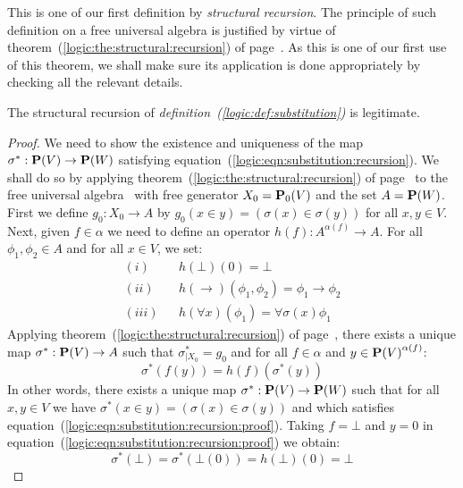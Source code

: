 This is one of our first definition by {\em structural recursion}.
The principle of such definition on a free universal algebra is
justified by virtue of
theorem~(\ref{logic:the:structural:recursion}) of
page~\pageref{logic:the:structural:recursion}. As this is one of our
first use of this theorem, we shall make sure its application is
done appropriately by checking all the relevant details.
\begin{prop}\label{logic:prop:substitution}
The structural recursion of {\em definition~(\ref{logic:def:substitution})} is legitimate.
\end{prop}
\begin{proof}
We need to show the existence and uniqueness of the map
$\sigma^{*}:\mbox{${\bf P}(V)$}\to{\bf P}(W)$ satisfying
equation~(\ref{logic:eqn:substitution:recursion}). We shall do so by
applying theorem~(\ref{logic:the:structural:recursion}) of
page~\pageref{logic:the:structural:recursion} to the free universal
algebra \pv\ with free generator $X_{0}=\mbox{${\bf P}_{0}(V)$}$ and the set $A={\bf
P}(W)$. First we define $g_{0}:X_{0}\to A$ by $g_{0}(x\in
y)=(\sigma(x)\in\sigma(y))$ for all $x,y\in V$. Next, given
$f\in\alpha$ we need to define an operator $h(f):A^{\alpha(f)}\to
A$. For all $\phi_{1},\phi_{2}\in A$ and for all $x\in V$, we set:
    \begin{eqnarray*}
    (i)&&h(\bot)(0)=\bot\\
    (ii)&&h(\to)(\phi_{1},\phi_{2})=\phi_{1}\to\phi_{2}\\
    (iii)&&h(\forall x)(\phi_{1})=\forall \sigma(x)\phi_{1}
    \end{eqnarray*}
Applying theorem~(\ref{logic:the:structural:recursion}) of
page~\pageref{logic:the:structural:recursion}, there exists a unique
map $\sigma^{*}:\mbox{${\bf P}(V)$}\to A$ such that $\sigma^{*}_{|X_{0}}=g_{0}$ and
for all $f\in\alpha$ and $y\in\mbox{${\bf P}(V)$}^{\alpha(f)}$:
    \begin{equation}\label{logic:eqn:substitution:recursion:proof}
    \sigma^{*}(f(y))=h(f)(\sigma^{*}(y))
    \end{equation}
In other words, there exists a unique map $\sigma^{*}:\mbox{${\bf P}(V)$}\to{\bf
P}(W)$ such that for all $x,y\in V$ we have  $\sigma^{*}(x\in
y)=(\sigma(x)\in\sigma(y))$  and which satisfies
equation~(\ref{logic:eqn:substitution:recursion:proof}). Taking
$f=\bot$ and $y=0$ in
equation~(\ref{logic:eqn:substitution:recursion:proof}) we obtain:
    \begin{equation}\label{logic:eqn:substitution:bot}
    \sigma^{*}(\bot)=\sigma^{*}(\bot(0))=h(\bot)(0)=\bot
    \end{equation}

\end{proof}
